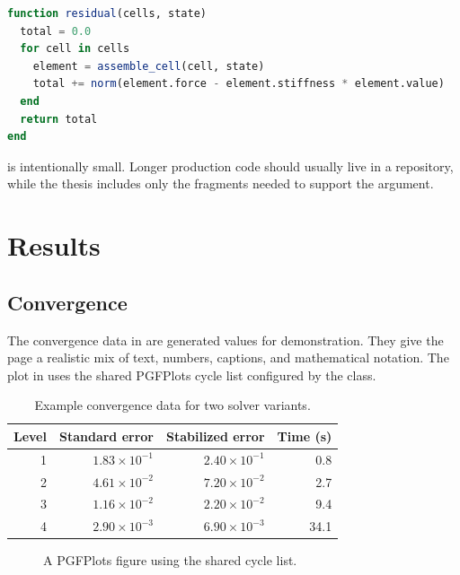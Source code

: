 \begin{lstlisting}[language=Julia, caption={Residual accumulation for a toy element loop.}, label={lst:solver}]
function residual(cells, state)
  total = 0.0
  for cell in cells
    element = assemble_cell(cell, state)
    total += norm(element.force - element.stiffness * element.value)
  end
  return total
end
\end{lstlisting}

 is intentionally small. Longer production code should usually
live in a repository, while the thesis includes only the fragments needed to
support the argument.

\chapter{Results}
\label{ch:results}

\section{Convergence}
\label{sec:convergence}

The convergence data in  are generated values for
demonstration. They give the page a realistic mix of text, numbers, captions,
and mathematical notation. The plot in  uses the shared
PGFPlots cycle list configured by the class.

\begin{table}[tbp]
  \centering
  \caption{Example convergence data for two solver variants.}
  \label{tab:convergence}
  \begin{tabular}{rrrr}
    \toprule
    Level & Standard error & Stabilized error & Time (s) \\
    \midrule
    1 & \(1.83\times10^{-1}\) & \(2.40\times10^{-1}\) & 0.8 \\
    2 & \(4.61\times10^{-2}\) & \(7.20\times10^{-2}\) & 2.7 \\
    3 & \(1.16\times10^{-2}\) & \(2.20\times10^{-2}\) & 9.4 \\
    4 & \(2.90\times10^{-3}\) & \(6.90\times10^{-3}\) & 34.1 \\
    \bottomrule
  \end{tabular}
\end{table}

\begin{figure}[tbp]
  \centering
  \caption{A PGFPlots figure using the shared cycle list.}
  \label{fig:error-plot}
\end{figure}

